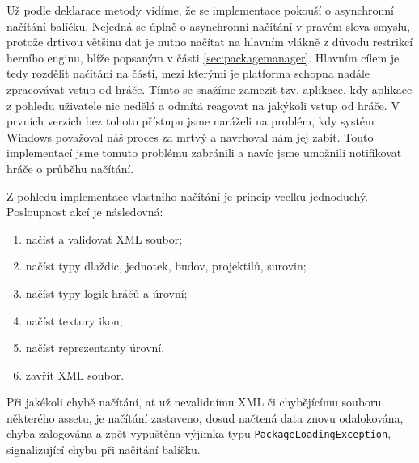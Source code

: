 Už podle deklarace metody vidíme, že se implementace pokouší o asynchronní načítání balíčku. Nejedná se úplně o asynchronní načítání v pravém slova smyslu, protože drtivou většinu dat je nutno načítat na hlavním vlákně z důvodu restrikcí herního enginu, blíže popsaným v části \ref{sec:packagemanager}. Hlavním cílem je tedy rozdělit načítání na části, mezi kterými je platforma schopna nadále zpracovávat vstup od hráče. Tímto se snažíme zamezit tzv.  aplikace, kdy aplikace z pohledu uživatele nic nedělá a odmítá reagovat na jakýkoli vstup od hráče. V prvních verzích bez tohoto přístupu jsme naráželi na problém, kdy systém Windows považoval náš proces za mrtvý a navrhoval nám jej zabít. Touto implementací jsme tomuto problému zabránili a navíc jsme umožnili notifikovat hráče o průběhu načítání.

Z pohledu implementace vlastního načítání je princip vcelku jednoduchý. Posloupnost akcí je následovná:

\begin{enumerate}
	\item načíst a validovat XML soubor;
	\item načíst typy dlaždic, jednotek, budov, projektilů, surovin;
	\item načíst typy logik hráčů a úrovní;
	\item načíst textury ikon;
	\item načíst reprezentanty úrovní,
	\item zavřít XML soubor.
\end{enumerate}

Při jakékoli chybě načítání, ať už nevalidnímu XML či chybějícímu souboru některého assetu, je načítání zastaveno, dosud načtená data znovu odalokována, chyba zalogována a zpět vypuštěna výjimka typu \texttt{PackageLoadingException}, signalizující chybu při načítání balíčku.

